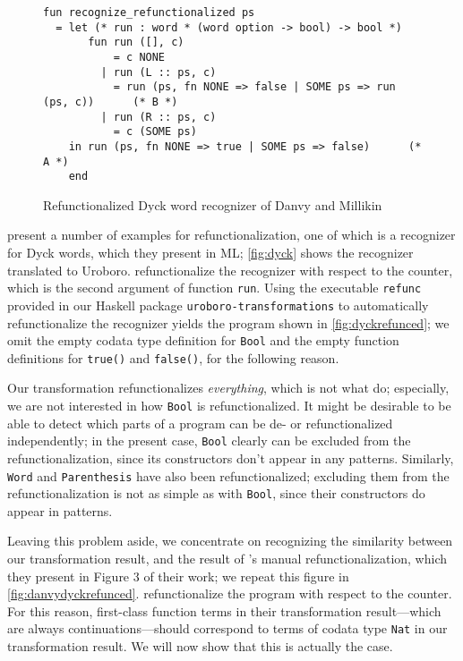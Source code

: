 \begin{figure}
\begin{lstlisting}
fun recognize_refunctionalized ps
  = let (* run : word * (word option -> bool) -> bool *)
       fun run ([], c) 
           = c NONE
         | run (L :: ps, c)
           = run (ps, fn NONE => false | SOME ps => run (ps, c))      (* B *)
         | run (R :: ps, c)
           = c (SOME ps)
    in run (ps, fn NONE => true | SOME ps => false)      (* A *)
    end
\end{lstlisting}
\caption{Refunctionalized Dyck word recognizer of Danvy and Millikin}
\label{fig:danvydyckrefunced}
\end{figure}

\citet{danvy09refunctionalization} present a number of examples for refunctionalization, one of which is a recognizer for Dyck words, which they present in ML; \autoref{fig:dyck} shows the recognizer translated to Uroboro. \citeauthor{danvy09refunctionalization} refunctionalize the recognizer with respect to the counter, which is the second argument of function \texttt{run}. Using the executable \texttt{refunc} provided in our Haskell package \texttt{uroboro-transformations} to automatically refunctionalize the recognizer yields the program shown in \autoref{fig:dyckrefunced}; we omit the empty codata type definition for \texttt{Bool} and the empty function definitions for \texttt{true()} and \texttt{false()}, for the following reason.

Our transformation refunctionalizes \textit{everything}, which is not what \citeauthor{danvy09refunctionalization} do; especially, we are not interested in how \texttt{Bool} is refunctionalized. It might be desirable to be able to detect which parts of a program can be de- or refunctionalized independently; in the present case, \texttt{Bool} clearly can be excluded from the refunctionalization, since its constructors don't appear in any patterns. Similarly, \texttt{Word} and \texttt{Parenthesis} have also been refunctionalized; excluding them from the refunctionalization is not as simple as with \texttt{Bool}, since their constructors do appear in patterns.

Leaving this problem aside, we concentrate on recognizing the similarity between our transformation result, and the result of \citeauthor{danvy09refunctionalization}'s manual refunctionalization, which they present in Figure 3 of their work; we repeat this figure in \autoref{fig:danvydyckrefunced}. \citeauthor{danvy09refunctionalization} refunctionalize the program with respect to the counter. For this reason, first-class function terms in their transformation result---which are always continuations---should correspond to terms of codata type \texttt{Nat} in our transformation result. We will now show that this is actually the case.

